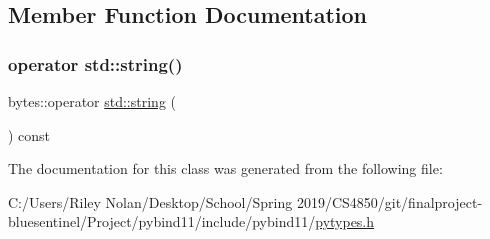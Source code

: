 \subsection{Member Function Documentation}
\mbox{\label{classbytes_a5e71a0d3b0f90c4859ca60b93c24f89f}} 
\subsubsection{\texorpdfstring{operator std::string()}{operator std::string()}}
{\footnotesize\ttfamily bytes\+::operator \mbox{\hyperlink{_s_d_l__opengl__glext_8h_ab4ccfaa8ab0e1afaae94dc96ef52dde1}{std\+::string}} (\begin{DoxyParamCaption}{ }\end{DoxyParamCaption}) const\hspace{0.3cm}{\ttfamily [inline]}}



The documentation for this class was generated from the following file\+:\begin{DoxyCompactItemize}
\item 
C\+:/\+Users/\+Riley Nolan/\+Desktop/\+School/\+Spring 2019/\+C\+S4850/git/finalproject-\/bluesentinel/\+Project/pybind11/include/pybind11/\mbox{\hyperlink{pytypes_8h}{pytypes.\+h}}\end{DoxyCompactItemize}
